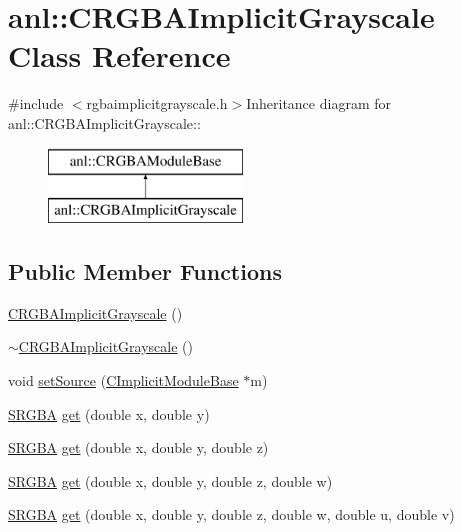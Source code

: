 \hypertarget{classanl_1_1CRGBAImplicitGrayscale}{
\section{anl::CRGBAImplicitGrayscale Class Reference}
\label{classanl_1_1CRGBAImplicitGrayscale}
}


{\ttfamily \#include $<$rgbaimplicitgrayscale.h$>$}Inheritance diagram for anl::CRGBAImplicitGrayscale::\begin{figure}[H]
\begin{center}
\leavevmode
\includegraphics[height=2cm]{classanl_1_1CRGBAImplicitGrayscale}
\end{center}
\end{figure}
\subsection*{Public Member Functions}
\begin{DoxyCompactItemize}
\item 
\hyperlink{classanl_1_1CRGBAImplicitGrayscale_aa48e261575b605eee82c95e95f41d9ca}{CRGBAImplicitGrayscale} ()
\item 
\hyperlink{classanl_1_1CRGBAImplicitGrayscale_a452b5faed032c0a952f030d46653f696}{$\sim$CRGBAImplicitGrayscale} ()
\item 
void \hyperlink{classanl_1_1CRGBAImplicitGrayscale_a26bc9403b469e7cb8dbb2c7645069aae}{setSource} (\hyperlink{classanl_1_1CImplicitModuleBase}{CImplicitModuleBase} $\ast$m)
\item 
\hyperlink{structanl_1_1SRGBA}{SRGBA} \hyperlink{classanl_1_1CRGBAImplicitGrayscale_a806ae7b00b96c104a926df3de2b9d3fb}{get} (double x, double y)
\item 
\hyperlink{structanl_1_1SRGBA}{SRGBA} \hyperlink{classanl_1_1CRGBAImplicitGrayscale_aaa69d1f706bec33d288385fd44c602c7}{get} (double x, double y, double z)
\item 
\hyperlink{structanl_1_1SRGBA}{SRGBA} \hyperlink{classanl_1_1CRGBAImplicitGrayscale_a56a233389828df6244a7dbad5722d059}{get} (double x, double y, double z, double w)
\item 
\hyperlink{structanl_1_1SRGBA}{SRGBA} \hyperlink{classanl_1_1CRGBAImplicitGrayscale_a047141373ae0ae8f3bcafc8664301956}{get} (double x, double y, double z, double w, double u, double v)
\end{DoxyCompactItemize}
